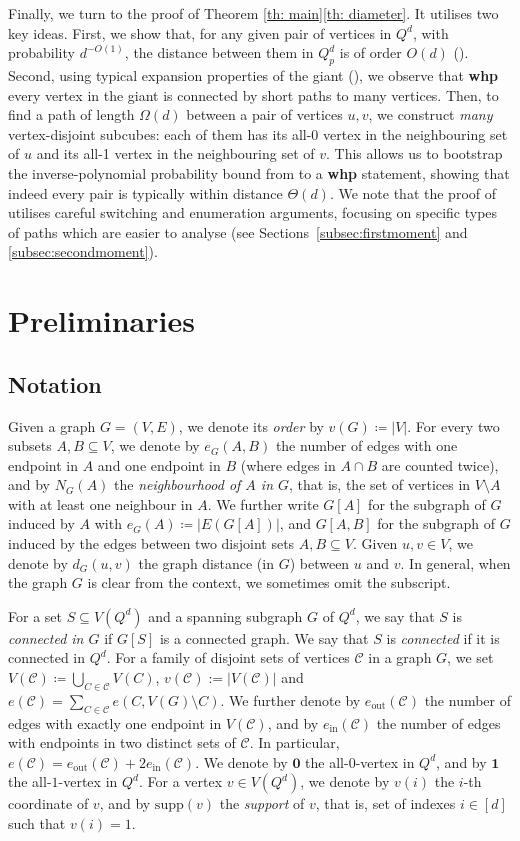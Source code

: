 \documentclass[reqno,final,a4paper]{amsart}
\theoremstyle{definition}
\newcommand{\cC}{\mathcal{C}}
\newcommand{\1}{\mathbbm{1}}
\begin{document}
Finally, we turn to the proof of Theorem \ref{th: main}\ref{th: diameter}. It utilises two key ideas. 
First, we show that, for any given pair of vertices in $Q^d$, with probability $d^{-O(1)}$, the distance between them in $Q^d_p$ is of order $O(d)$ (). 
Second, using typical expansion properties of the giant (), we observe that \textbf{whp} every vertex in the giant is connected by short paths to many vertices. 
Then, to find a path of length $\Omega(d)$ between a pair of vertices $u,v$, we construct \textit{many} vertex-disjoint subcubes: each of them has its all-0 vertex in the neighbouring set of $u$ and its all-1 vertex in the neighbouring set of $v$.
This allows us to bootstrap the inverse-polynomial probability bound from  to a \textbf{whp} statement, showing that indeed every pair is typically within distance $\Theta(d)$. 
We note that the proof of  utilises careful switching and enumeration arguments, focusing on specific types of paths which are easier to analyse (see Sections~\ref{subsec:firstmoment} and \ref{subsec:secondmoment}).


\section{Preliminaries}\label{s: prelim}
\subsection{Notation}
Given a graph $G=(V,E)$, we denote its \textit{order} by $v(G)\coloneqq |V|$. 
For every two subsets $A,B\subseteq V$, we denote by $e_G(A,B)$ the number of edges with one endpoint in $A$ and one endpoint in $B$ (where edges in $A\cap B$ are counted twice), and by $N_G(A)$ the \emph{neighbourhood of $A$ in $G$}, that is, the set of vertices in $V\setminus A$ with at least one neighbour in $A$. 
We further write $G[A]$ for the subgraph of $G$ induced by $A$ with $e_G(A)\coloneqq |E(G[A])|$, and $G[A,B]$ for the subgraph of $G$ induced by the edges between two disjoint sets $A,B\subseteq V$. 
Given $u,v\in V$, we denote by $d_G(u,v)$ the graph distance (in $G$) between $u$ and $v$. 
In general, when the graph $G$ is clear from the context, we sometimes omit the subscript. 


For a set $S\subseteq V(Q^d)$ and a spanning subgraph $G$ of $Q^d$, we say that $S$ is \emph{connected in $G$} if $G[S]$ is a connected graph. We say that $S$ is \emph{connected} if it is connected in $Q^d$.
For a family of disjoint sets of vertices $\cC$ in a graph $G$, we set $V(\cC)\coloneqq \bigcup_{C\in \cC}V(C)$, $v(\cC):=|V(\cC)|$ and $e(\cC)=\sum_{C\in \cC}e(C,V(G)\setminus C)$. 
We further denote by $e_{\mathrm{out}}(\cC)$ the number of edges with exactly one endpoint in $V(\cC)$, and by $e_{\mathrm{in}}(\cC)$ the number of edges with endpoints in two distinct sets of $\cC$. 
In particular, $e(\cC)=e_{\mathrm{out}}(\cC)+2e_{\mathrm{in}}(\cC)$. 
We denote by $\textbf{0}$ the all-$0$-vertex in $Q^d$, and by $\textbf{1}$ the all-$1$-vertex in $Q^d$.
For a vertex $v\in V(Q^d)$, we denote by $v(i)$ the $i$-th coordinate of $v$, and by $\mathrm{supp}(v)$ the \emph{support} of $v$, that is, set of indexes $i\in [d]$ such that $v(i)=1$. 
\end{document}
